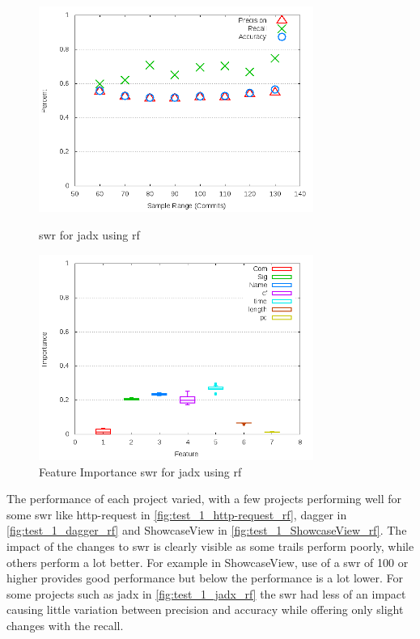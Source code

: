 \begin{figure}[!ht]
    \centering
        \includegraphics[width=0.8\textwidth]{images/rf/test_1/jadx_sample_range}
    \caption{\gls{swr} for jadx using \gls{rf}}
    \label{fig:test_1_jadx_rf}

    \includegraphics[width=0.8\textwidth]{images/rf/test_1/jadx_importance}
        \caption{Feature Importance \gls{swr} for jadx using \gls{rf}}
        \label{fig:test_1_jadx_rf_importance}
\end{figure}

The performance of each project varied, with a few projects performing well for some \gls{swr} like http-request in \autoref{fig:test_1_http-request_rf}, dagger in \autoref{fig:test_1_dagger_rf} and ShowcaseView in \autoref{fig:test_1_ShowcaseView_rf}. The impact of the changes to \gls{swr} is clearly visible as some trails perform poorly, while others perform a lot better. For example in ShowcaseView, use of a \gls{swr} of 100 or higher provides good performance but below the performance is a lot lower. For some projects such as jadx in \autoref{fig:test_1_jadx_rf} the \gls{swr} had less of an impact causing little variation between precision and accuracy while offering only slight changes with the recall.

